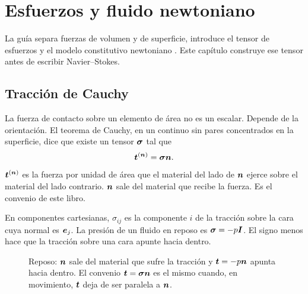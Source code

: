 \chapter{Esfuerzos y fluido newtoniano}
\label{ch:esfuerzos}

La guía separa fuerzas de volumen y de superficie, introduce el tensor de esfuerzos y el modelo constitutivo newtoniano \parencite{uleGuia2026}. Este capítulo construye ese tensor antes de escribir Navier--Stokes.

\section{Tracción de Cauchy}

La fuerza de contacto sobre un elemento de área no es un escalar. Depende de la orientación. El teorema de Cauchy, en un continuo sin pares concentrados en la superficie, dice que existe un tensor \(\boldsymbol{\sigma}\) tal que
\begin{equation}
\label{eq:cauchy}
\boldsymbol{t}^{(\boldsymbol{n})}=\boldsymbol{\sigma}\boldsymbol{n}.
\end{equation}
\(\boldsymbol{t}^{(\boldsymbol{n})}\) es la fuerza por unidad de área que el material del lado de \(\boldsymbol{n}\) ejerce sobre el material del lado contrario. \(\boldsymbol{n}\) sale del material que recibe la fuerza. Es el convenio de este libro.

En componentes cartesianas, \(\sigma_{ij}\) es la componente \(i\) de la tracción sobre la cara cuya normal es \(\boldsymbol{e}_j\). La presión de un fluido en reposo es \(\boldsymbol{\sigma}=-p\boldsymbol{I}\). El signo menos hace que la tracción sobre una cara apunte hacia dentro.

\begin{figure}[ht]
\centering
{}
\caption{Reposo: \(\boldsymbol{n}\) sale del material que sufre la tracción y \(\boldsymbol{t}=-p\boldsymbol{n}\) apunta hacia dentro. El convenio \(\boldsymbol{t}=\boldsymbol{\sigma}\boldsymbol{n}\) es el mismo cuando, en movimiento, \(\boldsymbol{t}\) deja de ser paralela a \(\boldsymbol{n}\).}
\label{fig:cauchy}
\end{figure}

